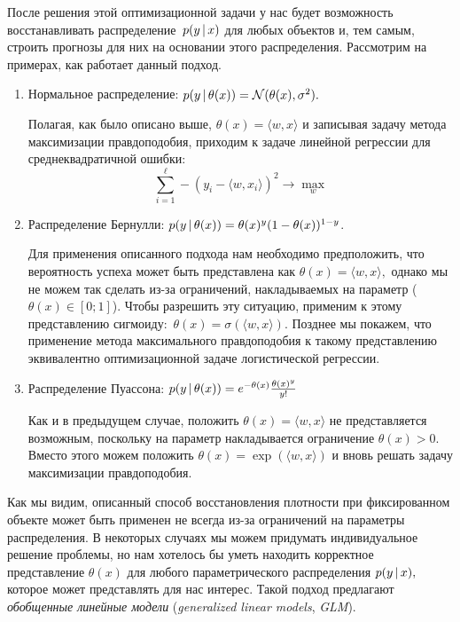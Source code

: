 \documentclass[12pt,a4paper]{article}
\begin{document}
    После решения этой оптимизационной задачи у нас будет возможность восстанавливать распределение~$p(y \mspace{3mu}{|}\mspace{3mu} x)$ для любых объектов и, тем самым, строить прогнозы для них на основании этого распределения. Рассмотрим на примерах, как работает данный подход.
    \newpage
    \begin{enumerate}
        \item Нормальное распределение: $p(y \mspace{3mu}{|}\mspace{3mu} \theta(x)) = \mathcal{N} (\theta(x), \sigma^2).$
        
        Полагая, как было описано выше, $\theta(x) = \langle w, x \rangle$ и записывая задачу метода максимизации правдоподобия, приходим к задаче линейной регрессии для среднеквадратичной ошибки:
        \begin{equation}
            \sum_{i=1}^\ell - (y_i - \langle w, x_i \rangle)^2 \to \max_w
        \end{equation}
        \item Распределение Бернулли: $p(y \mspace{3mu}{|}\mspace{3mu} \theta(x)) = \theta(x)^{y} (1 - \theta(x))^{1 - y}$.
        
        Для применения описанного подхода нам необходимо предположить, что вероятность успеха может быть представлена как $\theta(x) = \langle w, x \rangle,$ однако мы не можем так сделать из-за ограничений, накладываемых на параметр ($\theta(x) \in [0; 1]$). Чтобы разрешить эту ситуацию, применим к этому представлению сигмоиду:~$\theta(x) = \sigma(\langle w, x \rangle)$. Позднее мы покажем, что применение метода максимального правдоподобия к такому представлению эквивалентно оптимизационной задаче логистической регрессии.
        \item Распределение Пуассона: $p(y \mspace{3mu}{|}\mspace{3mu} \theta(x)) = e^{- \theta(x)} \frac{\theta(x)^y}{y!}$
        
        Как и в предыдущем случае, положить $\theta(x) = \langle w, x \rangle$ не представляется возможным, поскольку на параметр накладывается ограничение $\theta(x) > 0$. Вместо этого можем положить $\theta(x) = \exp(\langle w, x \rangle)$ и вновь решать задачу максимизации правдоподобия.
    \end{enumerate}
     
     Как мы видим, описанный способ восстановления плотности при фиксированном объекте может быть применен не всегда из-за ограничений на параметры распределения. В некоторых случаях мы можем придумать индивидуальное решение проблемы, но нам хотелось бы уметь находить корректное представление $\theta(x)$ для любого параметрического распределения $p(y \mspace{3mu}{|}\mspace{3mu} x),$ которое может представлять для нас интерес. Такой подход предлагают \emph{обобщенные линейные модели} (\emph{generalized linear models}, \emph{GLM}).
     
\end{document}
